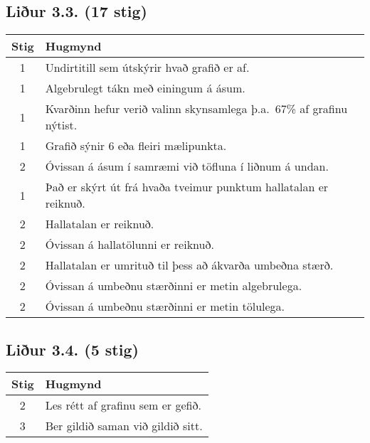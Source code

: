 \begin{tcolorbox}
\subsection*{Liður 3.3. (17 stig)}

\begin{table}[H]
    \centering
    \begin{tabular}{|c|l|}
    \hline
       \textbf{Stig}  & \textbf{Hugmynd}   \\ \hline \hline
         1  & Undirtitill sem útskýrir hvað grafið er af. \\ \hline
        1  & Algebrulegt tákn með einingum á ásum. \\ \hline
        1  & Kvarðinn hefur verið valinn skynsamlega þ.a.~67\% af grafinu nýtist. \\ \hline
        1  & Grafið sýnir 6 eða fleiri mælipunkta. \\ \hline
        2  & Óvissan á ásum í samræmi við töfluna í liðnum á undan. \\ \hline
        1  & Það er skýrt út frá hvaða tveimur punktum hallatalan er reiknuð. \\ \hline
        2  & Hallatalan er reiknuð. \\ \hline
        2 & Óvissan á hallatölunni er reiknuð. \\ \hline
        2  & Hallatalan er umrituð til þess að ákvarða umbeðna stærð.  \\ \hline
        2  & Óvissan á umbeðnu stærðinni er metin algebrulega.  \\ \hline
        2  & Óvissan á umbeðnu stærðinni er metin tölulega.  \\ \hline
    \end{tabular}
\end{table}

\subsection*{Liður 3.4. (5 stig)}

\begin{table}[H]
    \centering
    \begin{tabular}{|c|l|}
    \hline
       \textbf{Stig}  & \textbf{Hugmynd}   \\ \hline \hline
         2  & Les rétt af grafinu sem er gefið. \\ \hline
         3  & Ber gildið saman við gildið sitt. \\ \hline
    \end{tabular}
\end{table}


\end{tcolorbox}
